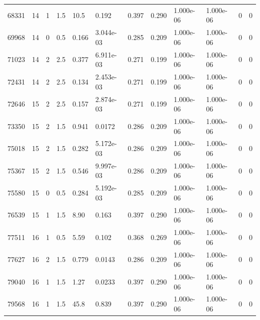 \documentclass[preview]{standalone}
\begin{document}
{{{\begin{tabular}{L{1.2cm}C{1.2cm} C{0.3cm}C{0.5cm} C{1.4cm}C{1.4cm} C{1.4cm}C{1.4cm} C{1.6cm}C{1.6cm} C{1.6cm}C{1.6cm}}
  68331  &    14  & 1     & 1.5 &  10.5  & 0.192  &  0.397&   0.290& 1.000e-06 & 1.000e-06   &  0 & 0  \\ 
  69968  &    14  & 0     & 0.5 &  0.166  & 3.044e-03  &  0.285&   0.209& 1.000e-06 & 1.000e-06   &  0 & 0  \\ 
  71023  &    14  & 2     & 2.5 &  0.377  & 6.911e-03  &  0.271&   0.199& 1.000e-06 & 1.000e-06   &  0 & 0  \\ 
  72431  &    14  & 2     & 2.5 &  0.134  & 2.453e-03  &  0.271&   0.199& 1.000e-06 & 1.000e-06   &  0 & 0  \\ 
  72646  &    15  & 2     & 2.5 &  0.157  & 2.874e-03  &  0.271&   0.199& 1.000e-06 & 1.000e-06   &  0 & 0  \\ 
  73350  &    15  & 2     & 1.5 &  0.941  & 0.0172  &  0.286&   0.209& 1.000e-06 & 1.000e-06   &  0 & 0  \\ 
  75018  &    15  & 2     & 1.5 &  0.282  & 5.172e-03  &  0.286&   0.209& 1.000e-06 & 1.000e-06   &  0 & 0  \\ 
  75367  &    15  & 2     & 1.5 &  0.546  & 9.997e-03  &  0.286&   0.209& 1.000e-06 & 1.000e-06   &  0 & 0  \\ 
  75580  &    15  & 0     & 0.5 &  0.284  & 5.192e-03  &  0.285&   0.209& 1.000e-06 & 1.000e-06   &  0 & 0  \\ 
  76539  &    15  & 1     & 1.5 &  8.90  & 0.163  &  0.397&   0.290& 1.000e-06 & 1.000e-06   &  0 & 0  \\ 
  77511  &    16  & 1     & 0.5 &  5.59  & 0.102  &  0.368&   0.269& 1.000e-06 & 1.000e-06   &  0 & 0  \\ 
  77627  &    16  & 2     & 1.5 &  0.779  & 0.0143  &  0.286&   0.209& 1.000e-06 & 1.000e-06   &  0 & 0  \\ 
  79040  &    16  & 1     & 1.5 &  1.27  & 0.0233  &  0.397&   0.290& 1.000e-06 & 1.000e-06   &  0 & 0  \\ 
  79568  &    16  & 1     & 1.5 &  45.8  & 0.839  &  0.397&   0.290& 1.000e-06 & 1.000e-06   &  0 & 0  \\ 
\hline 
\end{tabular} 

}}}
\end{document}
